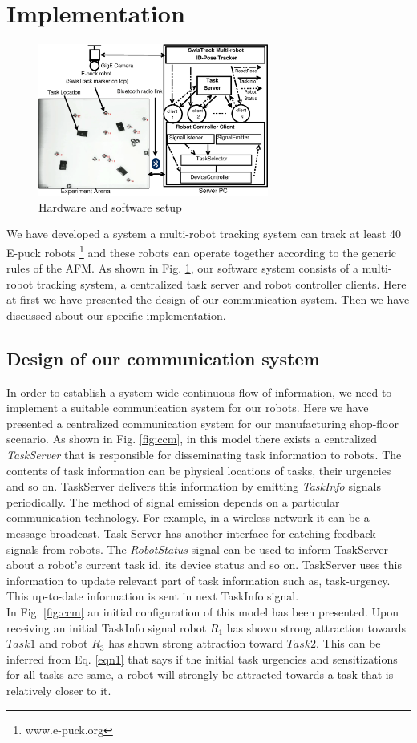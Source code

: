\documentclass{llncs}
\begin{document}
\section{Implementation}
\label{sec:impl}
\begin{figure}
\centering
\includegraphics[height=5cm, angle=0]
{./images/RIL-Expt-Setup1.eps}
\caption{\small Hardware and software setup}
\label{fig:setup} %
\end{figure}
We have developed a system a multi-robot tracking system can track at least 40 E-puck robots \footnote{www.e-puck.org} and these robots can operate together according to the generic rules of the AFM.
As shown in Fig. \ref{fig:setup}, our software system consists of a multi-robot tracking system, a centralized task server and robot controller clients. Here at first we have presented the design of our communication system. Then we have discussed about our specific implementation. 
\subsection{Design of our communication system}
In order to establish a system-wide continuous flow of information, we need to implement a suitable communication system for our robots. Here we have presented a centralized communication system for our manufacturing shop-floor scenario.
As shown in Fig. \ref{fig:ccm}, in this model there exists a centralized \textit{
TaskServer} that is responsible for disseminating task information to robots. The contents of task information can be physical locations of tasks, their urgencies and so on. TaskServer delivers this information by emitting \textit{TaskInfo} signals periodically. The method of signal emission depends on a particular communication technology. For example, in a wireless network it can be a message broadcast.
Task-Server has another interface for catching feedback signals from robots. The \textit{RobotStatus} signal can be used to inform TaskServer about a robot's current task id, its device status and so on. TaskServer uses this information to update relevant part of task information such as, task-urgency. This up-to-date information is sent in next TaskInfo signal.\\
In Fig. \ref{fig:ccm} an initial configuration of this model has been presented. Upon receiving an initial TaskInfo signal robot $R_1$ has shown strong attraction towards $Task1$ and robot $R_3$ has shown strong attraction toward $Task2$. This can be inferred from Eq. \ref{eqn1} that says if the initial task urgencies and sensitizations for all tasks are same, a robot will strongly be attracted towards a task that is relatively closer to it.
\end{document}
